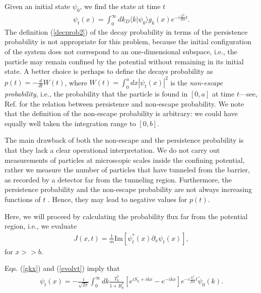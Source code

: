 \documentclass[12pt]{article}
\numberwithin{equation}{section}
\begin{document}

 \medskip
 Given an initial state $\psi_0$, we find the state at time $t$
 \begin{eqnarray}
 \psi_t(x) = \int_0^{\infty} dk {}_D\langle k|\psi_0\rangle  g_k(x) e^{ - i\frac{k^2}{2m}t}. \label{evolvt}
 \end{eqnarray}
 The  definition  (\ref{decprob2}) of the decay probability in terms of the persistence probability  is not appropriate for this problem, because the initial configuration of the system does not correspond to an one-dimensional subspace, i.e., the particle may remain confined by the potential without remaining in its initial state. A better choice is perhaps to define the decays probability as $p(t) = - \frac{d}{dt} W(t)$, where
$W(t) = \int_0^a dx|\psi_t(x)|^2$ is the  {\em non-escape probability}, i.e., the probability that the particle is found in $[0, a]$ at time $t$---see, Ref. \cite{CMM95} for the relation between persistence and non-escape probability. We note that the definition of the non-escape probability  is   arbitrary:
 we could have equally well  taken the integration range to $[0, b]$.

 The main drawback of both the non-escape and the persistence probability  is that they  lack a clear operational interpretation.
 We do not carry out measurements of particles at  microscopic scales inside the confining potential, rather we measure the number of particles that have tunneled from the barrier, as recorded by a detector  far from the tunneling region. Furthermore, the persistence probability and the non-escape probability are not always  increasing functions of $t$ \cite{Peshk}. Hence, they may lead to negative values for $p(t)$.

Here, we will proceed  by calculating the probability flux far from the potential region, i.e., we evaluate
\begin{eqnarray}
J(x, t) = \frac{1}{m}\mbox{Im} \left[ \psi^*_t(x) \partial_x \psi_t( x)\right],
\end{eqnarray}
for $x >> b$.

 Eqs. (\ref{gkx}) and (\ref{evolvt}) imply that
\begin{eqnarray}
\psi_t(x)  = -\frac{i}{\sqrt{2\pi}} \int _0^{\infty} dk  \frac{T^*_k}{1+R^*_k}  \left[ e^{iS_k +ikx}-  e^{-ikx}\right] e^{-i\frac{k^2}{2m}t}  \tilde{\psi}_0(k). \label{psitxx}
\end{eqnarray}
\end{document}
